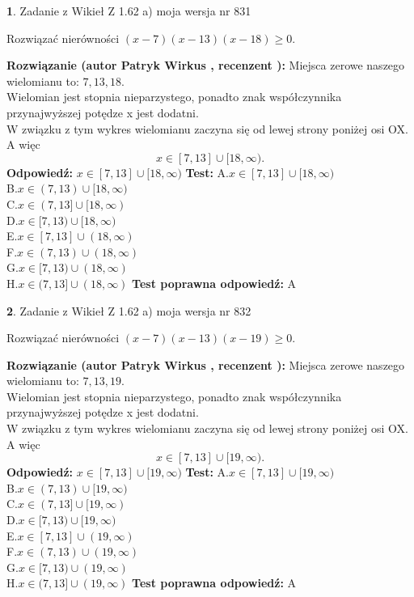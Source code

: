 \documentclass[12pt, a4paper]{article}
\theoremstyle{definition} %
\newtheorem{zad}{}
\newcommand{\zadStart}[1]{\begin{zad}#1\newline}
\newcommand{\zadStop}{\end{zad}}
\newcommand{\rozwStart}[2]{\noindent \textbf{Rozwiązanie (autor #1 , recenzent #2): }\newline}
\newcommand{\rozwStop}{\newline}
\newcommand{\odpStart}{\noindent \textbf{Odpowiedź:}\newline}
\newcommand{\odpStop}{\newline}
\newcommand{\testStart}{\noindent \textbf{Test:}\newline}
\newcommand{\testStop}{\newline}
\newcommand{\kluczStart}{\noindent \textbf{Test poprawna odpowiedź:}\newline}
\newcommand{\kluczStop}{\newline}
\begin{document}
\zadStart{Zadanie z Wikieł Z 1.62 a) moja wersja nr 831}

Rozwiązać nierówności $(x-7)(x-13)(x-18)\ge0$.
\zadStop
\rozwStart{Patryk Wirkus}{}
Miejsca zerowe naszego wielomianu to: $7, 13, 18$.\\
Wielomian jest stopnia nieparzystego, ponadto znak współczynnika przy\linebreak najwyższej potędze x jest dodatni.\\ W związku z tym wykres wielomianu zaczyna się od lewej strony poniżej osi OX. A więc $$x \in [7,13] \cup [18,\infty).$$
\rozwStop
\odpStart
$x \in [7,13] \cup [18,\infty)$
\odpStop
\testStart
A.$x \in [7,13] \cup [18,\infty)$\\
B.$x \in (7,13) \cup [18,\infty)$\\
C.$x \in (7,13] \cup [18,\infty)$\\
D.$x \in [7,13) \cup [18,\infty)$\\
E.$x \in [7,13] \cup (18,\infty)$\\
F.$x \in (7,13) \cup (18,\infty)$\\
G.$x \in [7,13) \cup (18,\infty)$\\
H.$x \in (7,13] \cup (18,\infty)$
\testStop
\kluczStart
A
\kluczStop



\zadStart{Zadanie z Wikieł Z 1.62 a) moja wersja nr 832}

Rozwiązać nierówności $(x-7)(x-13)(x-19)\ge0$.
\zadStop
\rozwStart{Patryk Wirkus}{}
Miejsca zerowe naszego wielomianu to: $7, 13, 19$.\\
Wielomian jest stopnia nieparzystego, ponadto znak współczynnika przy\linebreak najwyższej potędze x jest dodatni.\\ W związku z tym wykres wielomianu zaczyna się od lewej strony poniżej osi OX. A więc $$x \in [7,13] \cup [19,\infty).$$
\rozwStop
\odpStart
$x \in [7,13] \cup [19,\infty)$
\odpStop
\testStart
A.$x \in [7,13] \cup [19,\infty)$\\
B.$x \in (7,13) \cup [19,\infty)$\\
C.$x \in (7,13] \cup [19,\infty)$\\
D.$x \in [7,13) \cup [19,\infty)$\\
E.$x \in [7,13] \cup (19,\infty)$\\
F.$x \in (7,13) \cup (19,\infty)$\\
G.$x \in [7,13) \cup (19,\infty)$\\
H.$x \in (7,13] \cup (19,\infty)$
\testStop
\kluczStart
A
\kluczStop
\end{document}
